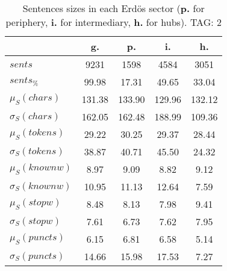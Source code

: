 \begin{table}[h!]
\begin{center}
\begin{tabular}{| l | c | c | c | c |}\hline
 & g. & p. & i. & h. \\\hline
$sents$ & 9231  & 1598  & 4584  & 3051 \\\hline
$sents_{\%}$ & 99.98  & 17.31  & 49.65  & 33.04 \\\hline
$\mu_S(chars)$ & 131.38  & 133.90  & 129.96  & 132.12 \\\hline
$\sigma_S(chars)$ & 162.05  & 162.48  & 188.99  & 109.36 \\\hline
$\mu_S(tokens)$ & 29.22  & 30.25  & 29.37  & 28.44 \\\hline
$\sigma_S(tokens)$ & 38.87  & 40.71  & 45.50  & 24.32 \\\hline
$\mu_S(knownw)$ & 8.97  & 9.09  & 8.82  & 9.12 \\\hline
$\sigma_S(knownw)$ & 10.95  & 11.13  & 12.64  & 7.59 \\\hline
$\mu_S(stopw)$ & 8.48  & 8.13  & 7.98  & 9.41 \\\hline
$\sigma_S(stopw)$ & 7.61  & 6.73  & 7.62  & 7.95 \\\hline
$\mu_S(puncts)$ & 6.15  & 6.81  & 6.58  & 5.14 \\\hline
$\sigma_S(puncts)$ & 14.66  & 15.98  & 17.53  & 7.27 \\\hline
\end{tabular}
\caption{Sentences sizes in each Erd\"os sector ({{\bf p.}} for periphery, {{\bf i.}} for intermediary, {{\bf h.}} for hubs). TAG: 2}
\end{center}
\end{table}